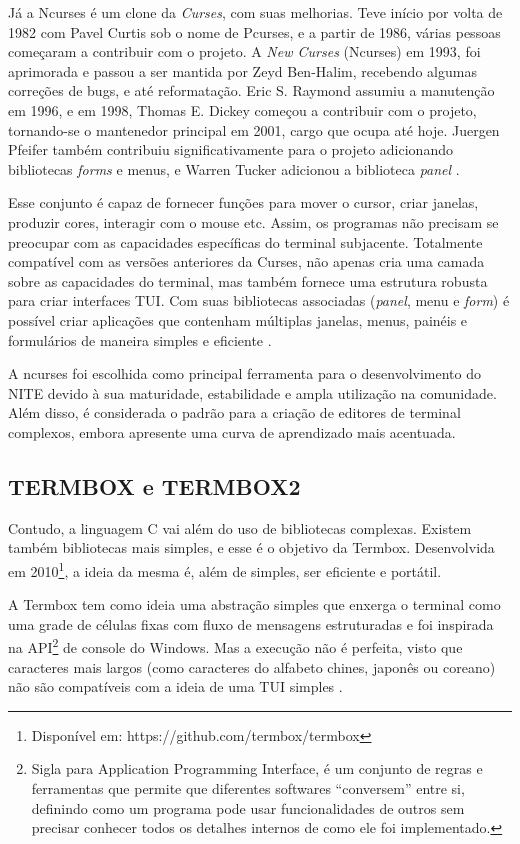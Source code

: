 Já a Ncurses é um clone da \textit{Curses}, com suas melhorias. Teve início por volta de 1982 com Pavel Curtis sob o nome de Pcurses, e a partir de 1986, várias pessoas começaram a contribuir com o projeto. A \textit{New Curses} (Ncurses) em 1993, foi aprimorada e passou a ser mantida por Zeyd Ben-Halim, recebendo algumas correções de bugs, e até reformatação. Eric S. Raymond assumiu a manutenção em 1996, e em 1998, Thomas E. Dickey começou a contribuir com o projeto, tornando-se o mantenedor principal em 2001, cargo que ocupa até hoje. Juergen Pfeifer também contribuiu significativamente para o projeto adicionando bibliotecas \textit{forms} e menus, e Warren Tucker adicionou a biblioteca \textit{panel} \cite{ncurses_site}.

Esse conjunto é capaz de fornecer funções para mover o cursor, criar janelas, produzir cores, interagir com o mouse etc. Assim, os programas não precisam se preocupar com as capacidades específicas do terminal subjacente. Totalmente compatível com as versões anteriores da Curses, não apenas cria uma camada sobre as capacidades do terminal, mas também fornece uma estrutura robusta para criar interfaces TUI. Com suas bibliotecas associadas (\textit{panel}, menu e \textit{form}) é possível criar aplicações que contenham múltiplas janelas, menus, painéis e formulários de maneira simples e eficiente \cite{ncurses_howto}.

A ncurses foi escolhida como principal ferramenta para o desenvolvimento do NITE devido à sua maturidade, estabilidade e ampla utilização na comunidade. Além disso, é considerada o padrão para a criação de editores de terminal complexos, embora apresente uma curva de aprendizado mais acentuada.

\subsection{TERMBOX e TERMBOX2}

Contudo, a linguagem C vai além do uso de bibliotecas complexas. Existem também bibliotecas mais simples, e esse é o objetivo da Termbox. Desenvolvida em 2010\footnote{Disponível em: https://github.com/termbox/termbox}, a ideia da mesma é, além de simples, ser eficiente e portátil.

A Termbox tem como ideia uma abstração simples que enxerga o terminal como uma grade de células fixas com fluxo de mensagens estruturadas e foi inspirada na API\footnote{Sigla para Application Programming Interface, é um conjunto de regras e ferramentas que permite que diferentes softwares “conversem” entre si, definindo como um programa pode usar funcionalidades de outros sem precisar conhecer todos os detalhes internos de como ele foi implementado.} de console do Windows. Mas a execução não é perfeita, visto que caracteres mais largos (como caracteres do alfabeto chines, japonês ou coreano) não são compatíveis com a ideia de uma TUI simples \cite{termbox_googlecode}.

